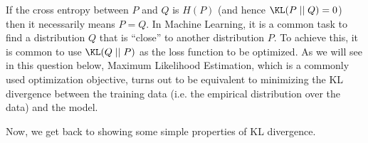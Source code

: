 If the cross entropy between $P$ and $Q$ is $H(P)$ (and hence $\KL(P\mid \mid Q) = 0$) then it necessarily
means $P = Q$. In Machine Learning, it is a common task to find a distribution $Q$ that is ``close'' to
another distribution $P$. To achieve this, it is common to use $\KL(Q\mid \mid P)$ as the loss function to be optimized.
As we will see in this question below, Maximum Likelihood Estimation, which is a commonly used
optimization objective, turns out to be equivalent to minimizing the KL divergence between the training data
(i.e. the empirical distribution over the data)
and the model.

Now, we get back to showing some simple properties of KL divergence.

\begin{enumerate}

  

  

  

\end{enumerate}
